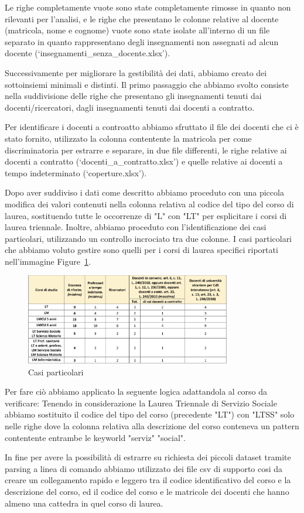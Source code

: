 Le righe completamente vuote sono state completamente rimosse in quanto non rilevanti per l'analisi,
e le righe che presentano le colonne relative al docente (matricola, nome e cognome) vuote sono state isolate
all'interno di un file separato in quanto rappresentano degli insegnamenti non assegnati
ad alcun docente (`insegnamenti\_senza\_docente.xlsx').

Successivamente per migliorare la gestibilità dei dati, abbiamo creato dei sottoinsiemi minimali e distinti.
Il primo passaggio che abbiamo svolto consiste nella suddivisione delle righe che presentano gli insegnamenti
tenuti dai docenti/ricercatori, dagli insegnamenti tenuti dai docenti a contratto.

Per identificare i docenti a controatto abbiamo sfruttato il file dei docenti che ci è stato fornito,
utilizzato la colonna contentente la matricola per come discriminatoria per estrarre e separare, in due file differenti,
le righe relative ai docenti a contratto (`docenti\_a\_contratto.xlsx') e quelle relative ai docenti a tempo indeterminato (`coperture.xlsx').

Dopo aver suddiviso i dati come descritto abbiamo proceduto con una piccola modifica dei valori contenuti nella colonna relativa al
codice del tipo del corso di laurea, sostituendo tutte le occorrenze di "L" con "LT" per esplicitare i corsi di laurea triennale.
Inoltre, abbiamo proceduto con l'identificazione dei casi particolari, utilizzando un controllo incrociato tra due colonne.
I casi particolari che abbiamo voluto gestire sono quelli per i corsi di laurea specifici riportati nell'immagine Figure~\ref{fig:casi_particolari}.

\begin{figure}[h]
    \centering
    \includegraphics[width=0.8\textwidth]{./images/tabellaministeriale.png}
    \caption{Casi particolari}
    \label{fig:casi_particolari}
\end{figure}

Per fare ciò abbiamo applicato la seguente logica adattandola al corso da verificare:
Tenendo in considerazione la Laurea Triennale di Servizio Sociale abbiamo sostituito il codice del tipo del corso (precedente "LT") con "LTSS"
solo nelle righe dove la colonna relativa alla descrizione del corso conteneva un pattern contentente entrambe le keyworld "serviz" "social".


In fine per avere la possibilità di estrarre su richiesta dei piccoli dataset tramite parsing a linea di comando abbiamo utilizzato
dei file csv di supporto cosi da creare un collegamento rapido e leggero tra il codice identificativo del corso e la descrizione del corso,
ed il codice del corso e le matricole dei docenti che hanno almeno una cattedra in quel corso di laurea.
